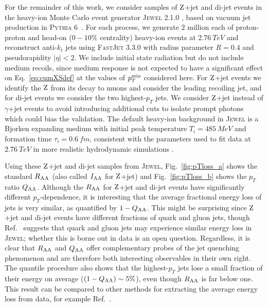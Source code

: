 \documentclass[aps,prl,twocolumn,preprintnumbers,superscriptaddress,showpacs,floatfix, nofootinbib]{revtex4-1}
\newcommand{\Z}{\rm Z}
\newcommand{\Eq}[1]{Eq.~\eqref{#1}}
\newcommand{\Fig}[1]{Fig.~\ref{#1}}
\newcommand{\Ref}[1]{Ref.~\cite{#1}}
\begin{document}
For the remainder of this work, we consider samples of $\Z$+jet and di-jet events in the heavy-ion Monte Carlo event generator \textsc{Jewel} 2.1.0 \cite{Zapp:2013vla,KunnawalkamElayavalli:2016ttl}, based on vacuum jet production in \textsc{Pythia} 6~\cite{Sjostrand:2006za}.
%
For each process, we generate $2$ million each of proton-proton and head-on ($0-10\%$ centrality) heavy-ion events at $\SI{2.76}{TeV}$ and reconstruct anti-$k_t$ jets using \textsc{FastJet} 3.3.0 \cite{Cacciari:2008gp,Cacciari:2011ma} with radius parameter $R=0.4$ and pseudorapidity $|\eta|<2$.
%
We include initial state radiation but do not include medium recoils, since medium response is not expected to have a significant effect on \Eq{eq:cumXSdef} at the values of $p_T^{\rm min}$ considered here.
%
For $\Z$+jet events we identify the $\Z$ from its decay to muons and consider the leading recoiling jet, and for di-jet events we consider the two highest-$p_T$ jets.
%
We consider $\Z$+jet instead of $\gamma$+jet events to avoid introducing additional cuts to isolate prompt photons which could bias the validation.
%
The default heavy-ion background in \textsc{Jewel} is a Bjorken expanding medium with initial peak temperature $T_i = \SI{485}{MeV}$ and formation time $\tau_i=\SI{0.6}{fm}$, consistent with the parameters used to fit data at $\SI{2.76}{TeV}$ in more realistic hydrodynamic simulations \cite{KunnawalkamElayavalli:2016ttl,Shen:2012vn}.

Using these $\Z$+jet and di-jet samples from \textsc{Jewel}, \Fig{fig:pTloss_a} shows the standard $R_{\rm AA}$ (also called $I_{\rm AA}$ for $\Z$+jet) and \Fig{fig:pTloss_b} shows the $p_T$ ratio $Q_{\rm AA}$.
%
Although the $R_{\rm AA}$ for $\Z$+jet and di-jet events have significantly different $p_T$-dependence, it is interesting that the average fractional energy loss of jets is very similar, as quantified by $1 - Q_{\rm AA}$.
%
This might be surprising since $\Z$+jet and di-jet events have different fractions of quark and gluon jets, though \Ref{Apolinario:2018rhj} suggests that quark and gluon jets may experience similar energy loss in \textsc{Jewel}; whether this is borne out in data is an open question.
%
Regardless, it is clear that $R_{\rm AA}$ and $Q_{\rm AA}$ offer complementary probes of the jet quenching phenomenon and are therefore both interesting observables in their own right. 
%
The quantile procedure also shows that the highest-$p_T$ jets lose a small fraction of their energy on average ($(1 - Q_{\rm AA}) \sim 5\%$), even though $R_{\rm AA}$ is far below one.
%
This result can be compared to other methods for extracting the average energy loss from data, for example \Ref{He:2018gks}.
\end{document}

